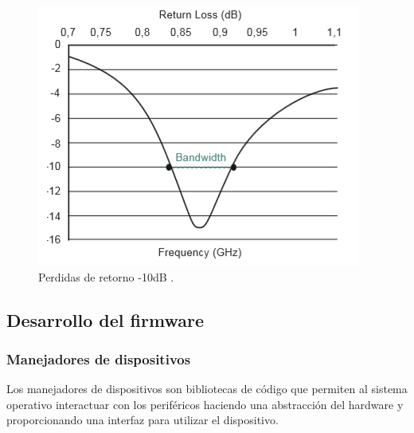 %
\begin{figure}[H]
	\centering
	\includegraphics[scale=.6]{./Figures/returnlossTeorico.PNG}
\caption{Perdidas de retorno -10dB \protect\footnotemark.}
	\label{fig:returnlossTeorico}
\end{figure}



\subsection{Desarrollo del firmware}
 
 \subsubsection{Manejadores de dispositivos}
 Los manejadores de dispositivos son bibliotecas de código que permiten al sistema operativo interactuar con los periféricos haciendo una abstracción del hardware y proporcionando una interfaz para utilizar el dispositivo.
 
